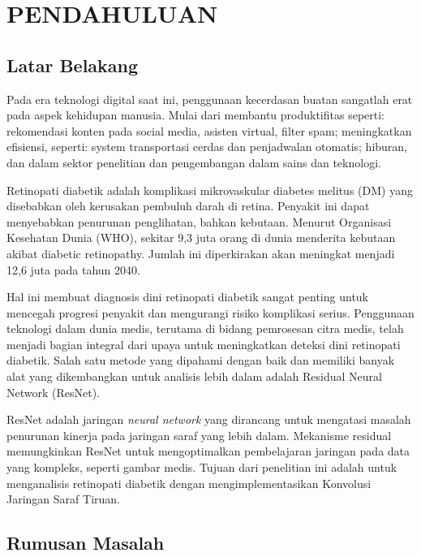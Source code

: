 \chapter{PENDAHULUAN}

\section{Latar Belakang}

Pada era teknologi digital saat ini, penggunaan kecerdasan buatan sangatlah erat pada aspek kehidupan manusia. Mulai dari membantu produktifitas seperti: rekomendasi konten pada social media, asisten virtual, filter spam; meningkatkan efisiensi, seperti: system transportasi cerdas dan penjadwalan otomatis; hiburan, dan dalam sektor penelitian dan pengembangan dalam sains dan teknologi.

Retinopati diabetik adalah komplikasi mikrovaskular diabetes melitus (DM) yang disebabkan oleh kerusakan pembuluh darah di retina. Penyakit ini dapat menyebabkan penurunan penglihatan, bahkan kebutaan\parencite{Yusran2022}. Menurut Organisasi Kesehatan Dunia (WHO), sekitar 9,3 juta orang di dunia menderita kebutaan akibat diabetic retinopathy. Jumlah ini diperkirakan akan meningkat menjadi 12,6 juta pada tahun 2040.

Hal ini membuat diagnosis dini retinopati diabetik sangat penting untuk mencegah progresi penyakit dan mengurangi risiko komplikasi serius. Penggunaan teknologi dalam dunia medis, terutama di bidang pemrosesan citra medis, telah menjadi bagian integral dari upaya untuk meningkatkan deteksi dini retinopati diabetik. Salah satu metode yang dipahami dengan baik dan memiliki banyak alat yang dikembangkan untuk analisis lebih dalam adalah Residual Neural Network (ResNet).

ResNet adalah jaringan \emph{neural network} yang dirancang untuk mengatasi masalah penurunan kinerja pada jaringan saraf yang lebih dalam. Mekanisme residual memungkinkan ResNet untuk mengoptimalkan pembelajaran jaringan pada data yang kompleks, seperti gambar medis. Tujuan dari penelitian ini adalah untuk menganalisis retinopati diabetik dengan mengimplementasikan Konvolusi Jaringan Saraf Tiruan.


\section{Rumusan Masalah}

